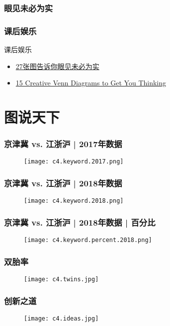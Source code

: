 \begin{frame}
  \frametitle{眼见未必为实}
  \begin{figure}
    \centering
    \quad
  \end{figure}
\end{frame}

\begin{frame}
  \frametitle{课后娱乐}
  \begin{block}{课后娱乐}
    \begin{itemize}
      \item \href{http://www.guancha.cn/Celebrity/2014_11_04_282826.shtml}{27张图告诉你眼见未必为实}
      \item \href{http://creately.com/blog/diagrams/creative-venn-diagrams/}{15 Creative Venn Diagrams to Get You Thinking}
    \end{itemize}
  \end{block}
\end{frame}

\section{图说天下}
\begin{frame}
  \frametitle{京津冀 vs. 江浙沪 | 2017年数据}
  \begin{figure}
    \centering
    \texttt{[image: c4.keyword.2017.png]}
  \end{figure}
\end{frame}

\begin{frame}
  \frametitle{京津冀 vs. 江浙沪 | 2018年数据}
  \begin{figure}
    \centering
    \texttt{[image: c4.keyword.2018.png]}
  \end{figure}
\end{frame}

\begin{frame}
  \frametitle{京津冀 vs. 江浙沪 | 2018年数据 | 百分比}
  \begin{figure}
    \centering
    \texttt{[image: c4.keyword.percent.2018.png]}
  \end{figure}
\end{frame}

\begin{frame}
  \frametitle{双胎率}
  \begin{figure}
    \centering
    \texttt{[image: c4.twins.jpg]}
  \end{figure}
\end{frame}

\begin{frame}
  \frametitle{创新之道}
  \begin{figure}
    \centering
    \texttt{[image: c4.ideas.jpg]}
  \end{figure}
\end{frame}




